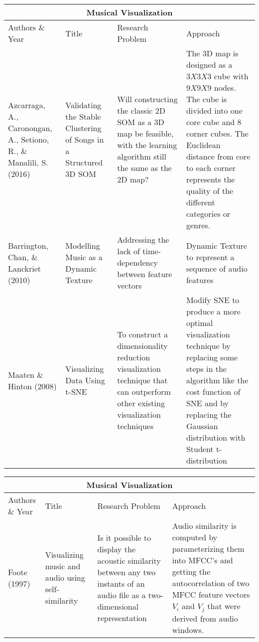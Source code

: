 \begin{center}
\begin{tabular}{ |p{3cm}|p{3cm}|p{3cm}|p{3cm}| }
 \hline
 \multicolumn{4}{|c|}{Musical Visualization} \\
 \hline
 Authors \& Year&Title&Research Problem&Approach\\
\hline
 Azcarraga, A., Caronongan, A., Setiono, R., \& Manalili, S. (2016) & Validating the Stable Clustering of Songs in a Structured 3D SOM & Will constructing the classic 2D SOM as a 3D map be feasible, with the learning algorithm still the same as the 2D map? & The 3D map is designed as a $3X3X3$ cube with $9X9X9$ nodes. The cube is divided into one core cube and 8 corner cubes. The Euclidean distance from core to each corner represents the quality of the different categories or genres. \\
\hline
Barrington, Chan, \& Lanckriet (2010) & Modelling Music as a Dynamic Texture &Addressing the lack of time-dependency between feature vectors & Dynamic Texture to represent a sequence of audio features \\
\hline
Maaten \& Hinton (2008) & Visualizing Data Using t-SNE &To construct a dimensionality reduction visualization technique that can outperform other existing visualization techniques & Modify SNE to produce a more optimal visualization technique by replacing some steps in the algorithm like the cost function of SNE and by replacing the Gaussian distribution with Student t-distribution \\
 \hline
\end{tabular}
\end{center}
\begin{center}
\begin{tabular}{ |p{3cm}|p{3cm}|p{3cm}|p{3cm}| }
 \hline
 \multicolumn{4}{|c|}{Musical Visualization} \\
 \hline
 Authors \& Year&Title&Research Problem&Approach\\
 \hline
 Foote (1997) & Visualizing music and audio using self-similarity & Is it possible to display the acoustic similarity between any two instants of an audio file as a two-dimensional representation & Audio similarity is computed by parameterizing them into MFCC’s and getting the autocorrelation of two MFCC feature vectors $V_i$ and $V_j$ that were derived from audio windows. \\
 \hline
\end{tabular}
\end{center}

